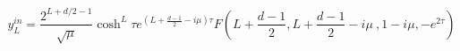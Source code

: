 \begin{equation}
y^{in}_L=\frac{2^{L+d/2-1}}{\sqrt{\mu}}
\cosh^L\tau e^{(L+\frac{d-1}{2}-i\mu)\tau}
F(L+\frac{d-1}{2},L+\frac{d-1}{2}-i\mu \ ,
1-i\mu, -e^{2\tau}) 
\end{equation}

